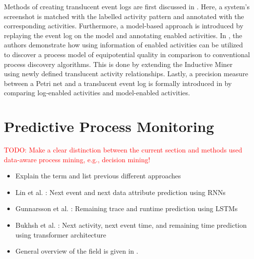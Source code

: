 Methods of creating translucent event logs are first discussed in \cite{creating-translucent-event-logs}. Here, a system's screenshot is matched with the labelled activity pattern and annotated with the corresponding activities. Furthermore, a model-based approach is introduced by replaying the event log on the model and annotating enabled activities. In \cite{translucent-activity-relationships}, the authors demonstrate how using information of enabled activities can be utilized to discover a process model of equipotential quality in comparison to conventional process discovery algorithms. This is done by extending the Inductive Miner \cite{inductive-miner} using newly defined translucent activity relationships. Lastly, a precision measure between a Petri net and a translucent event log is formally introduced in \cite{translucent-precision} by comparing log-enabled activities and model-enabled activities.

\section{Predictive Process Monitoring}

\textcolor{red}{TODO: Make a clear distinction between the current section and methods used data-aware process mining, e.g., decision mining!}

\begin{itemize}
    \item Explain the term and list previous different approaches
    \item Lin et al. \cite{predictive-process-monitoring-rnn}: Next event and next data attribute prediction using RNNs
    \item Gunnarsson et al. \cite{predictive-process-monitoring-lstm}: Remaining trace and runtime prediction using LSTMs
    \item Bukhsh et al. \cite{predictive-process-monitoring-transformer}: Next activity, next event time, and remaining time prediction using transformer architecture
    \item General overview of the field is given in \cite{predictive-process-monitoring}.
\end{itemize}